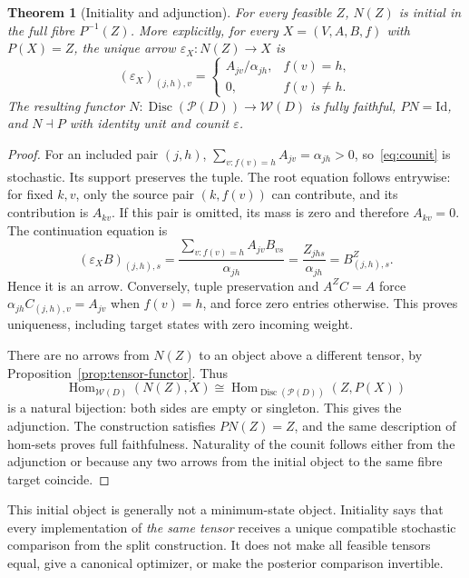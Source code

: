 \documentclass[11pt]{article}
\newcommand{\Hom}{\operatorname{Hom}}
\newcommand{\W}{\mathcal W}
\newcommand{\Pcal}{\mathcal P}
\newtheorem{theorem}{Theorem}[section]
\theoremstyle{remark}
\begin{document}
\begin{theorem}[Initiality and adjunction]\label{thm:initial}
For every feasible $Z$, $N(Z)$ is initial in the full fibre $P^{-1}(Z)$. More explicitly, for every $X=(V,A,B,f)$ with $P(X)=Z$, the unique arrow $\varepsilon_X:N(Z)\to X$ is
\begin{equation}\label{eq:counit}
 (\varepsilon_X)_{(j,h),v}
 =\begin{cases}
 A_{jv}/\alpha_{jh},&f(v)=h,\\
 0,&f(v)\ne h.
 \end{cases}
\end{equation}
The resulting functor $N:\operatorname{Disc}(\Pcal(D))\to\W(D)$ is fully faithful, $PN=\mathrm{Id}$, and $N\dashv P$ with identity unit and counit $\varepsilon$.
\end{theorem}
\begin{proof}
For an included pair $(j,h)$, $\sum_{v:f(v)=h}A_{jv}=\alpha_{jh}>0$, so~\eqref{eq:counit} is stochastic. Its support preserves the tuple. The root equation follows entrywise: for fixed $k,v$, only the source pair $(k,f(v))$ can contribute, and its contribution is $A_{kv}$. If this pair is omitted, its mass is zero and therefore $A_{kv}=0$. The continuation equation is
\[
 (\varepsilon_XB)_{(j,h),s}
 =\frac{\sum_{v:f(v)=h}A_{jv}B_{vs}}{\alpha_{jh}}
 =\frac{Z_{jhs}}{\alpha_{jh}}=B^Z_{(j,h),s}.
\]
Hence it is an arrow. Conversely, tuple preservation and $A^ZC=A$ force $\alpha_{jh}C_{(j,h),v}=A_{jv}$ when $f(v)=h$, and force zero entries otherwise. This proves uniqueness, including target states with zero incoming weight.

There are no arrows from $N(Z)$ to an object above a different tensor, by Proposition~\ref{prop:tensor-functor}. Thus
\[
 \Hom_{\W(D)}(N(Z),X)
 \cong\Hom_{\operatorname{Disc}(\Pcal(D))}(Z,P(X))
\]
is a natural bijection: both sides are empty or singleton. This gives the adjunction. The construction satisfies $PN(Z)=Z$, and the same description of hom-sets proves full faithfulness. Naturality of the counit follows either from the adjunction or because any two arrows from the initial object to the same fibre target coincide.
\end{proof}

This initial object is generally not a minimum-state object. Initiality says that every implementation of \emph{the same tensor} receives a unique compatible stochastic comparison from the split construction. It does not make all feasible tensors equal, give a canonical optimizer, or make the posterior comparison invertible.
\end{document}

